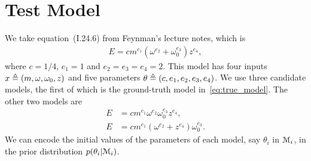 \documentclass[11pt]{article}
\numberwithin{equation}{section}
\begin{document}
\section{Test Model}
We take equation~(I.24.6) from Feynman's lecture notes, which is 
\begin{align}
E = cm^{e_1}(\omega^{e_2}+\omega_0^{e_3})z^{e_4}, \label{eq:true_model} 
\end{align}
where $c=1/4$, $e_1=1$ and $e_2=e_3=e_4=2$. 
This model has four inputs $x\triangleq (m,\omega,\omega_0,z)$ and five parameters $\theta\triangleq (c,e_1,e_2,e_3,e_4)$. We use three candidate models, the first of which is the ground-truth model in~\eqref{eq:true_model}. The other two models are
\begin{align}
E &= cm^{e_1}\omega^{e_2}\omega_0^{e_3}z^{e_4},\\
E &= cm^{e_1}(\omega^{e_2}+z^{e_4})\omega_0^{e_3}. 
\end{align}
We can encode the initial values of the parameters of each model, say $\theta_i$ in $\mathcal{M}_i$, in the prior distribution $p(\theta_i|\mathcal{M}_i)$. 



\end{document}
